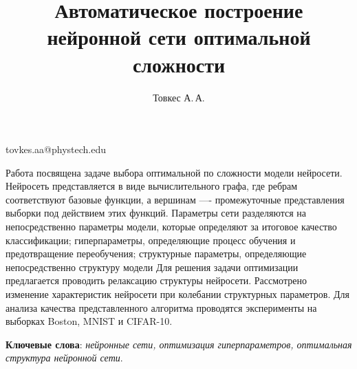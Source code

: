 \documentclass[12pt,twoside]{article}
\begin{document}
\title
    {Автоматическое построение нейронной сети оптимальной сложности}
\author
    {Товкес А.\,А.} %
\email
    {tovkes.aa@phystech.edu}
\abstract
	{Работа посвящена задаче выбора оптимальной по сложности модели нейросети. Нейросеть представляется в виде вычислительного графа, где ребрам соответствуют базовые функции, а вершинам —- промежуточные представления выборки под действием этих функций. Параметры сети разделяются на непосредственно параметры модели, которые определяют за итоговое качество классификации; гиперпараметры, определяющие процесс обучения и предотвращение переобучения; структурные параметры, определяющие непосредственно структуру модели 
    Для решения задачи оптимизации предлагается проводить релаксацию структуры нейросети. Рассмотрено изменение характеристик нейросети при колебании структурных параметров. Для анализа качества представленного алгоритма проводятся эксперименты на выборках Boston, MNIST и CIFAR-10.

	

\bigskip
\textbf{Ключевые слова}: \emph {нейронные сети, оптимизация гиперпараметров, оптимальная структура нейронной сети}.

}
\maketitle
\end{document}
